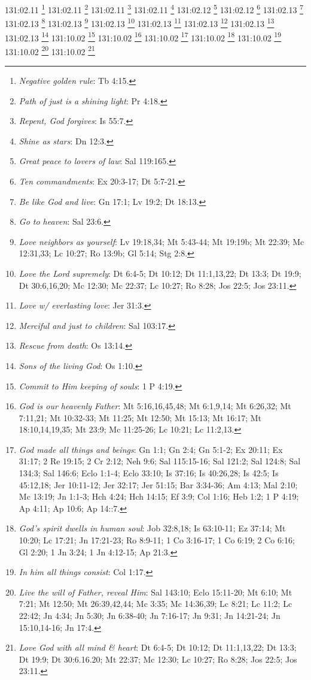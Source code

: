 {{{{{{{{{{{131:02.11 \footnote{\textit{Negative golden rule}: Tb 4:15.}
131:02.11 \footnote{\textit{Path of just is a shining light}: Pr 4:18.}
131:02.11 \footnote{\textit{Repent, God forgives}: Is 55:7.}
131:02.11 \footnote{\textit{Shine as stars}: Dn 12:3.}
131:02.12 \footnote{\textit{Great peace to lovers of law}: Sal 119:165.}
131:02.12 \footnote{\textit{Ten commandments}: Ex 20:3-17; Dt 5:7-21.}
131:02.13 \footnote{\textit{Be like God and live}: Gn 17:1; Lv 19:2; Dt 18:13.}
131:02.13 \footnote{\textit{Go to heaven}: Sal 23:6.}
131:02.13 \footnote{\textit{Love neighbors as yourself}: Lv 19:18,34; Mt 5:43-44; Mt 19:19b; Mt 22:39; Mc 12:31,33; Lc 10:27; Ro 13:9b; Gl 5:14; Stg 2:8.}
131:02.13 \footnote{\textit{Love the Lord supremely}: Dt 6:4-5; Dt 10:12; Dt 11:1,13,22; Dt 13:3; Dt 19:9; Dt 30:6,16,20; Mc 12:30; Mc 22:37; Lc 10:27; Ro 8:28; Jos 22:5; Jos 23:11.}
131:02.13 \footnote{\textit{Love w/ everlasting love}: Jer 31:3.}
131:02.13 \footnote{\textit{Merciful and just to children}: Sal 103:17.}
131:02.13 \footnote{\textit{Rescue from death}: Os 13:14.}
131:02.13 \footnote{\textit{Sons of the living God}: Os 1:10.}
131:10.02 \footnote{\textit{Commit to Him keeping of souls}: 1 P 4:19.}
131:10.02 \footnote{\textit{God is our heavenly Father}: Mt 5:16,16,45,48; Mt 6:1,9,14; Mt 6:26,32; Mt 7:11,21; Mt 10:32-33; Mt 11:25; Mt 12:50; Mt 15:13; Mt 16:17; Mt 18:10,14,19,35; Mt 23:9; Mc 11:25-26; Lc 10:21; Lc 11:2,13.}
131:10.02 \footnote{\textit{God made all things and beings}: Gn 1:1; Gn 2:4; Gn 5:1-2; Ex 20:11; Ex 31:17; 2 Re 19:15; 2 Cr 2:12; Neh 9:6; Sal 115:15-16; Sal 121:2; Sal 124:8; Sal 134:3; Sal 146:6; Eclo 1:1-4; Eclo 33:10; Is 37:16; Is 40:26,28; Is 42:5; Is 45:12,18; Jer 10:11-12; Jer 32:17; Jer 51:15; Bar 3:34-36; Am 4:13; Mal 2:10; Mc 13:19; Jn 1:1-3; Hch 4:24; Hch 14:15; Ef 3:9; Col 1:16; Heb 1:2; 1 P 4:19; Ap 4:11; Ap 10:6; Ap 14::7.}
131:10.02 \footnote{\textit{God's spirit dwells in human soul}: Job 32:8,18; Is 63:10-11; Ez 37:14; Mt 10:20; Lc 17:21; Jn 17:21-23; Ro 8:9-11; 1 Co 3:16-17; 1 Co 6:19; 2 Co 6:16; Gl 2:20; 1 Jn 3:24; 1 Jn 4:12-15; Ap 21:3.}
131:10.02 \footnote{\textit{In him all things consist}: Col 1:17.}
131:10.02 \footnote{\textit{Live the will of Father, reveal Him}: Sal 143:10; Eclo 15:11-20; Mt 6:10; Mt 7:21; Mt 12:50; Mt 26:39,42,44; Mc 3:35; Mc 14:36,39; Lc 8:21; Lc 11:2; Lc 22:42; Jn 4:34; Jn 5:30; Jn 6:38-40; Jn 7:16-17; Jn 9:31; Jn 14:21-24; Jn 15:10,14-16; Jn 17:4.}
131:10.02 \footnote{\textit{Love God with all mind & heart}: Dt 6:4-5; Dt 10:12; Dt 11:1,13,22; Dt 13:3; Dt 19:9; Dt 30:6.16.20; Mt 22:37; Mc 12:30; Lc 10:27; Ro 8:28; Jos 22:5; Jos 23:11.}
}}}}}}}}}}}
